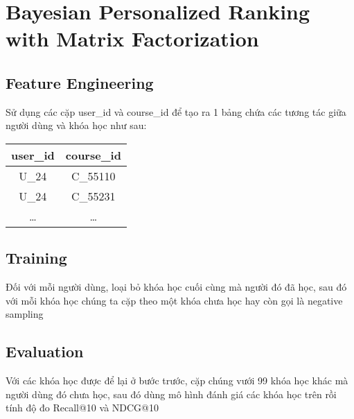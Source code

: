\section{Bayesian Personalized Ranking with Matrix Factorization}
\subsection{Feature Engineering}
Sử dụng các cặp user\_id và course\_id để tạo ra 1 bảng chứa các tương tác giữa
người dùng và khóa học như sau:

\begin{center}
\begin{tabular}{cc}
    user\_id & course\_id \\
    \toprule
    U\_24 & C\_55110 \\
    U\_24 & C\_55231 \\
    \ldots & \ldots
\end{tabular}
\end{center}

\subsection{Training}
Đối với mỗi người dùng, loại bỏ khóa học cuối cùng mà người đó đã học, sau đó
với mỗi khóa học chúng ta cặp theo một khóa chưa học hay còn gọi là negative
sampling

\subsection{Evaluation}
Với các khóa học được để lại ở bước trước, cặp chúng vưới 99 khóa học khác mà
người dùng đó chưa học, sau đó dùng mô hình đánh giá các khóa học trên rồi tính
độ đo Recall@10 và NDCG@10
